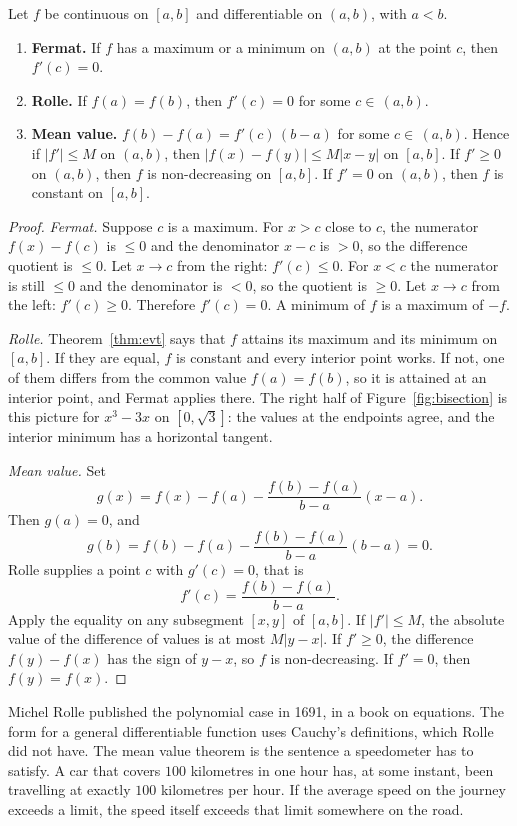 \begin{theorem}\label{thm:mvt}
Let $f$ be continuous on $[a,b]$ and differentiable on $(a,b)$, with $a<b$.
\begin{enumerate}[label=(\alph*)]
\item \textbf{Fermat.} If $f$ has a maximum or a minimum on $(a,b)$ at the point $c$, then $f'(c)=0$.
\item \textbf{Rolle.} If $f(a)=f(b)$, then $f'(c)=0$ for some $c\in\,(a,b)$.
\item \textbf{Mean value.} $f(b)-f(a)=f'(c)\,(b-a)$ for some $c\in\,(a,b)$. Hence if $|f'|\le M$ on $(a,b)$, then $|f(x)-f(y)|\le M|x-y|$ on $[a,b]$. If $f'\ge0$ on $(a,b)$, then $f$ is non-decreasing on $[a,b]$. If $f'=0$ on $(a,b)$, then $f$ is constant on $[a,b]$.
\end{enumerate}
\end{theorem}
\begin{proof}
\emph{Fermat.} Suppose $c$ is a maximum. For $x>c$ close to $c$, the numerator $f(x)-f(c)$ is $\le0$ and the denominator $x-c$ is $>0$, so the difference quotient is $\le0$. Let $x\to c$ from the right: $f'(c)\le0$. For $x<c$ the numerator is still $\le0$ and the denominator is $<0$, so the quotient is $\ge0$. Let $x\to c$ from the left: $f'(c)\ge0$. Therefore $f'(c)=0$. A minimum of $f$ is a maximum of $-f$.

\emph{Rolle.} Theorem~\ref{thm:evt} says that $f$ attains its maximum and its minimum on $[a,b]$. If they are equal, $f$ is constant and every interior point works. If not, one of them differs from the common value $f(a)=f(b)$, so it is attained at an interior point, and Fermat applies there. The right half of Figure~\ref{fig:bisection} is this picture for $x^3-3x$ on $[0,\sqrt3]$: the values at the endpoints agree, and the interior minimum has a horizontal tangent.

\emph{Mean value.} Set
\[
g(x)=f(x)-f(a)-\frac{f(b)-f(a)}{b-a}(x-a).
\]
Then $g(a)=0$, and
\[
g(b)=f(b)-f(a)-\frac{f(b)-f(a)}{b-a}(b-a)=0.
\]
Rolle supplies a point $c$ with $g'(c)=0$, that is
\[
f'(c)=\frac{f(b)-f(a)}{b-a}.
\]
Apply the equality on any subsegment $[x,y]$ of $[a,b]$. If $|f'|\le M$, the absolute value of the difference of values is at most $M|y-x|$. If $f'\ge0$, the difference $f(y)-f(x)$ has the sign of $y-x$, so $f$ is non-decreasing. If $f'=0$, then $f(y)=f(x)$.
\end{proof}

Michel Rolle published the polynomial case in 1691, in a book on equations. The form for a general differentiable function uses Cauchy's definitions, which Rolle did not have. The mean value theorem is the sentence a speedometer has to satisfy. A car that covers $100$ kilometres in one hour has, at some instant, been travelling at exactly $100$ kilometres per hour. If the average speed on the journey exceeds a limit, the speed itself exceeds that limit somewhere on the road.

